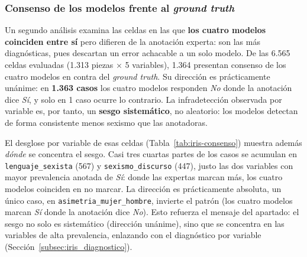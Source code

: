 \subsubsection{Consenso de los modelos frente al \textit{ground truth}}

Un segundo análisis examina las celdas en las que \textbf{los cuatro modelos
coinciden entre sí} pero difieren de la anotación experta: son las más
diagnósticas, pues descartan un error achacable a un solo modelo. De
las 6.565 celdas evaluadas (1.313 piezas $\times$ 5 variables), 1.364 presentan
consenso de los cuatro modelos en contra del \textit{ground truth}. Su dirección
es prácticamente unánime: en \textbf{1.363 casos} los cuatro modelos responden \textit{No}
donde la anotación dice \textit{Sí}, y solo en 1 caso ocurre lo contrario. La
infradetección observada por variable es, por tanto, un \textbf{sesgo sistemático},
no aleatorio: los modelos detectan de forma consistente menos sexismo que las
anotadoras.

El desglose por variable de esas celdas (Tabla~\ref{tab:iris-consenso}) muestra
además \emph{dónde} se concentra el sesgo. Casi tres cuartas partes de los casos se
acumulan en \texttt{lenguaje\_sexista} (567) y \texttt{sexismo\_discurso} (447),
justo las dos variables con mayor prevalencia anotada de \textit{Sí}: donde las
expertas marcan más, los cuatro modelos coinciden en no marcar. La dirección es
prácticamente absoluta, un único caso, en \texttt{asimetria\_mujer\_hombre}, invierte
el patrón (los cuatro modelos marcan \textit{Sí} donde la anotación dice \textit{No}).
Esto refuerza el mensaje del apartado: el sesgo no solo es sistemático (dirección
unánime), sino que se concentra en las variables de alta prevalencia, enlazando con
el diagnóstico por variable (Sección~\ref{subsec:iris_diagnostico}).

